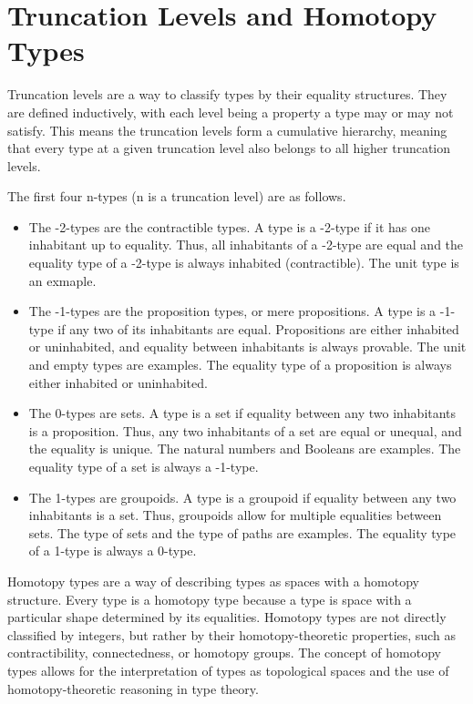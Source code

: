 \documentclass{article}
\begin{document}
\section{Truncation Levels and Homotopy Types}

\begin{remark}
  Truncation levels are a way to classify types by their equality structures. They are defined inductively, with each level being a property a type may or may not satisfy. This means the truncation levels form a cumulative hierarchy, meaning that every type at a given truncation level also belongs to all higher truncation levels.
\end{remark}

\begin{remark}[Examples]
  The first four n-types (n is a truncation level) are as follows.
  \begin{itemize}
    \item The -2-types are the contractible types. A type is a -2-type if it has one inhabitant up to equality. Thus, all inhabitants of a -2-type are equal and the equality type of a -2-type is always inhabited (contractible). The unit type is an exmaple.

    \item The -1-types are the proposition types, or mere propositions. A type is a -1-type if any two of its inhabitants are equal. Propositions are either inhabited or uninhabited, and equality between inhabitants is always provable. The unit and empty types are examples. The equality type of a proposition is always either inhabited or uninhabited.

    \item The 0-types are sets. A type is a set if equality between any two inhabitants is a proposition. Thus, any two inhabitants of a set are equal or unequal, and the equality is unique. The natural numbers and Booleans are examples. The equality type of a set is always a -1-type.

    \item The 1-types are groupoids. A type is a groupoid if equality between any two inhabitants is a set. Thus, groupoids allow for multiple equalities between sets. The type of sets and the type of paths are examples. The equality type of a 1-type is always a 0-type.
  \end{itemize}
\end{remark}

\begin{remark}
  Homotopy types are a way of describing types as spaces with a homotopy structure. Every type is a homotopy type because a type is space with a particular shape determined by its equalities. Homotopy types are not directly classified by integers, but rather by their homotopy-theoretic properties, such as contractibility, connectedness, or homotopy groups. The concept of homotopy types allows for the interpretation of types as topological spaces and the use of homotopy-theoretic reasoning in type theory.
\end{remark}
\end{document}

